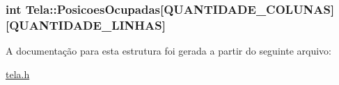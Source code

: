 \subsubsection[{Posicoes\+Ocupadas}]{\setlength{\rightskip}{0pt plus 5cm}int Tela\+::\+Posicoes\+Ocupadas\mbox{[}{\bf Q\+U\+A\+N\+T\+I\+D\+A\+D\+E\+\_\+\+C\+O\+L\+U\+N\+A\+S}\mbox{]}\mbox{[}{\bf Q\+U\+A\+N\+T\+I\+D\+A\+D\+E\+\_\+\+L\+I\+N\+H\+A\+S}\mbox{]}}\label{structTela_a7d45fe01c75d7df950c6b310e45b1b2f}


A documentação para esta estrutura foi gerada a partir do seguinte arquivo\+:\begin{DoxyCompactItemize}
\item 
\hyperlink{tela_8h}{tela.\+h}\end{DoxyCompactItemize}
